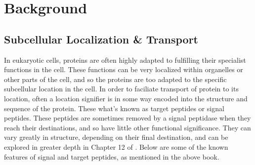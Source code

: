 \documentclass{bioinfo}
\begin{document}




\section{Background}

\subsection{Subcellular Localization \& Transport}

In eukaryotic cells, proteins are often highly adapted to fulfilling their specialist functions in the cell.
These functions can be very localized within organelles or other parts of the cell, and so the proteins are too adapted to the specific subcellular location in the cell. 
In order to faciliate transport of protein to its location, often a location signifier is in some way encoded into the structure and sequence of the protein.
These what's known as target peptides or signal peptides. 
These peptides are sometimes removed by a signal peptidase when they reach their destinations, and so have little other functional significance. 
They can vary greatly in structure, depending on their final destination, and can be explored in greater depth in Chapter 12 of \cite{Alb00}. 
Below are some of the known features of signal and target peptides, as mentioned in the above book.
\end{document}
